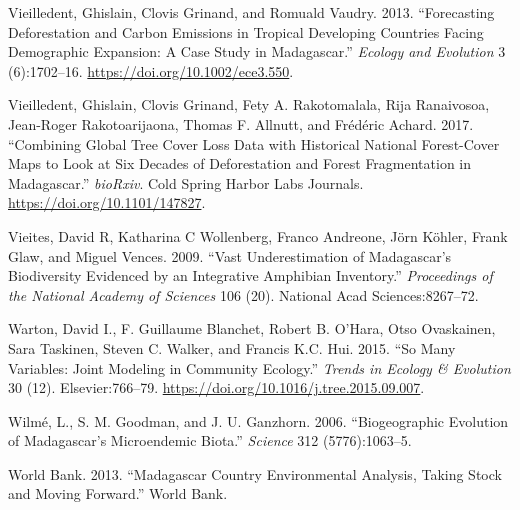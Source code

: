 \documentclass[12pt,]{article}
\begin{document}
\leavevmode\hypertarget{ref-Vieilledent2013}{}%
Vieilledent, Ghislain, Clovis Grinand, and Romuald Vaudry. 2013.
``Forecasting Deforestation and Carbon Emissions in Tropical Developing
Countries Facing Demographic Expansion: A Case Study in Madagascar.''
\emph{Ecology and Evolution} 3 (6):1702--16.
\url{https://doi.org/10.1002/ece3.550}.

\leavevmode\hypertarget{ref-Vieilledent2017}{}%
Vieilledent, Ghislain, Clovis Grinand, Fety A. Rakotomalala, Rija
Ranaivosoa, Jean-Roger Rakotoarijaona, Thomas F. Allnutt, and Frédéric
Achard. 2017. ``Combining Global Tree Cover Loss Data with Historical
National Forest-Cover Maps to Look at Six Decades of Deforestation and
Forest Fragmentation in Madagascar.'' \emph{bioRxiv}. Cold Spring Harbor
Labs Journals. \url{https://doi.org/10.1101/147827}.

\leavevmode\hypertarget{ref-Vieites2009}{}%
Vieites, David R, Katharina C Wollenberg, Franco Andreone, Jörn Köhler,
Frank Glaw, and Miguel Vences. 2009. ``Vast Underestimation of
Madagascar's Biodiversity Evidenced by an Integrative Amphibian
Inventory.'' \emph{Proceedings of the National Academy of Sciences} 106
(20). National Acad Sciences:8267--72.

\leavevmode\hypertarget{ref-Warton2015}{}%
Warton, David I., F. Guillaume Blanchet, Robert B. O'Hara, Otso
Ovaskainen, Sara Taskinen, Steven C. Walker, and Francis K.C. Hui. 2015.
``So Many Variables: Joint Modeling in Community Ecology.'' \emph{Trends
in Ecology \& Evolution} 30 (12). Elsevier:766--79.
\url{https://doi.org/10.1016/j.tree.2015.09.007}.

\leavevmode\hypertarget{ref-Wilme2006}{}%
Wilmé, L., S. M. Goodman, and J. U. Ganzhorn. 2006. ``Biogeographic
Evolution of Madagascar's Microendemic Biota.'' \emph{Science} 312
(5776):1063--5.

\leavevmode\hypertarget{ref-WorldBank2013}{}%
World Bank. 2013. ``Madagascar Country Environmental Analysis, Taking
Stock and Moving Forward.'' World Bank.
\end{document}
